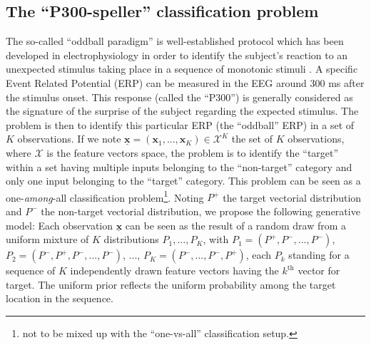\documentclass[conference]{IEEEtran}
\begin{document}
\subsection{The ``P300-speller'' classification problem}

The so-called ``oddball paradigm'' is well-established protocol which has been developed in electrophysiology 
in order to identify the subject's reaction to an unexpected stimulus taking place 
in a sequence of monotonic stimuli \cite{Farwell88}.
A specific Event Related Potential (ERP) can be measured in the EEG around 300 ms after the stimulus onset.
This response (called the ``P300'') is generally considered as the signature of the surprise of the subject regarding 
the expected stimulus. 
The problem is then to identify this particular
ERP (the ``oddball'' ERP) in a set of $K$ observations. 
If we note $\underline{\mathbf{x}} = (\boldsymbol{x}_1,...,\boldsymbol{x}_K) \in \mathcal{X}^K$ the set of $K$ observations,
where $\mathcal{X}$ is the feature vectors space, 
the problem is to identify the ``target'' 
within a set having multiple inputs belonging to the ``non-target'' category
and only one input belonging to the ``target'' category. 
This problem can be seen as a one-\emph{among}-all classification problem\footnote{not to be mixed up with the ``one-vs-all'' classification setup.}.
Noting $P^+$ the target vectorial distribution and
$P^-$ the non-target vectorial distribution, we propose the following generative model: 
Each observation $\underline{\mathbf{x}}$ can be seen as the result of a random draw from a uniform 
mixture of $K$ distributions $P_1, ..., P_K$,  
with $P_1 = (P^+,P^-,...,P^-)$, $P_2=(P^-,P^+,P^-,...,P^-)$, ..., $P_K=(P^-,...,P^-,P^+)$,
each $P_k$ standing for a sequence of $K$ independently drawn feature vectors having the $k^\text{th}$ vector for target.
The uniform prior reflects the uniform probability among the target location in the sequence.
\end{document}
